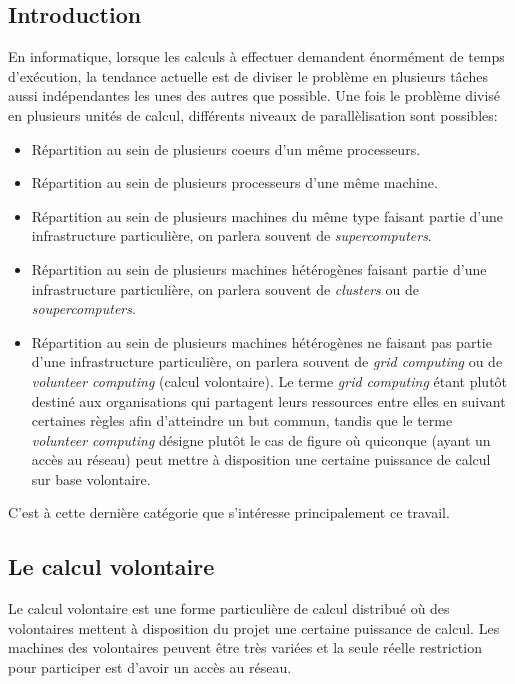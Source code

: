 \documentclass[a4paper, 11pt]{report}
\begin{document}
\subsection{Introduction}
En informatique, lorsque les calculs à effectuer demandent énormément de temps d'exécution, la tendance actuelle est de diviser le problème en plusieurs tâches aussi indépendantes les unes des autres que possible. Une fois le problème divisé en plusieurs unités de calcul, différents niveaux de parallèlisation sont possibles:
\begin{itemize}
\item Répartition au sein de plusieurs coeurs d'un même processeurs. %
\item Répartition au sein de plusieurs processeurs d'une même machine. %
\item Répartition au sein de plusieurs machines du même type faisant partie d'une infrastructure particulière, on parlera souvent de \textit{supercomputers}.
\item Répartition au sein de plusieurs machines hétérogènes faisant partie d'une infrastructure particulière, on parlera souvent de \textit{clusters} ou de \textit{soupercomputers}. %
\item Répartition au sein de plusieurs machines hétérogènes ne faisant pas partie d'une infrastructure particulière, on parlera souvent de \textit{grid computing} ou de \textit{volunteer computing} (calcul volontaire). Le terme \textit{grid computing} étant plutôt destiné aux organisations qui partagent leurs ressources entre elles en suivant certaines règles afin d'atteindre un but commun, tandis que le terme \textit{volunteer computing} désigne plutôt le cas de figure où quiconque (ayant un accès au réseau) peut mettre à disposition une certaine puissance de calcul sur base volontaire.
\end{itemize}
C'est à cette dernière catégorie que s'intéresse principalement ce travail. 

\subsection{Le calcul volontaire}
\label{calculvolontaire}
Le calcul volontaire est une forme particulière de calcul distribué où des volontaires mettent à disposition du projet une certaine puissance de calcul. Les machines des volontaires peuvent être très variées et la seule réelle restriction pour participer est d'avoir un accès au réseau. 
\end{document}
